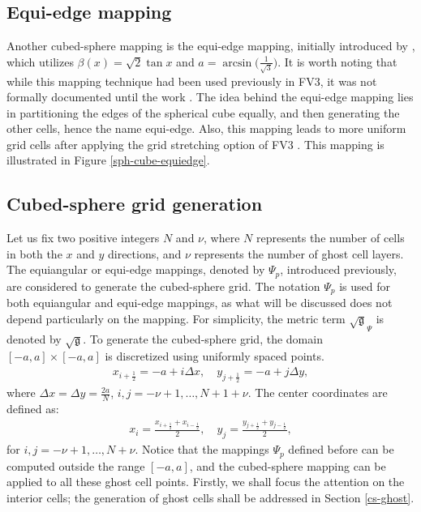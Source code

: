 \documentclass[preprint,12pt]{elsarticle}
\begin{document}
\begin{linenumbers}
\subsection{Equi-edge mapping}
\label{cs-equiedge}
Another cubed-sphere mapping is the equi-edge mapping, initially introduced by \cite{chen:2021}, which utilizes $\beta(x) = \sqrt{2}\tan{x}$ and $a=\arcsin{\big(\frac{1}{\sqrt{3}}\big)}$. It is worth noting that while this mapping technique had been used previously in FV3, it was not formally documented until the work \cite{chen:2021}.
The idea behind the equi-edge mapping lies in partitioning the edges of the spherical cube equally,
and then generating the other cells, hence the name equi-edge.
Also, this mapping leads to more uniform grid cells after applying the grid stretching option of FV3 \citep{harris:2016, chen:2021}.
This mapping is illustrated in Figure \ref{sph-cube-equiedge}.

\subsection{Cubed-sphere grid generation}
\label{cs-grid}
Let us fix two positive integers $N$ and $\nu$, where $N$ represents the number of cells in both the $x$ and $y$ directions, and $\nu$ represents the number of ghost cell layers. 
The equiangular or equi-edge mappings, denoted by $\Psi_p$, introduced previously, are considered to generate the cubed-sphere grid.
The notation $\Psi_p$ is used for both equiangular and equi-edge mappings, as what will be discussed does not depend particularly on the mapping.
For simplicity, the metric term $\sqrt{\mathfrak{g}}_{\Psi}$ is denoted by $\sqrt{\mathfrak{g}}$.
To generate the cubed-sphere grid, the domain $[-a,a]\times[-a,a]$ is discretized using uniformly spaced points.
\begin{align}
\label{edge-coords}
x_{i+\frac{1}{2}} = -a+i\Delta x, \quad
y_{j+\frac{1}{2}} = -a+j\Delta y,
\end{align}
where $\Delta x = \Delta y = \frac{2a}{N}$, $i,j=-\nu+1,\ldots,N+1+\nu$. The center coordinates  are defined as:
\begin{align}
	\label{center-coords}
	x_{i} = \frac{x_{i+\frac{1}{2}}+x_{i-\frac{1}{2}}}{2}, \quad
	y_{j} = \frac{y_{j+\frac{1}{2}}+y_{j-\frac{1}{2}}}{2},
\end{align}
for $i,j=-\nu+1,\ldots,N+\nu$.
Notice that the mappings ${\Psi}_p$ defined before can be computed outside the range $[-a,a]$, and the cubed-sphere mapping can be applied to all these ghost cell points.
Firstly, we shall focus the attention on the interior cells; the generation of ghost cells shall be addressed in Section \ref{cs-ghost}.


\end{linenumbers}
\end{document}
